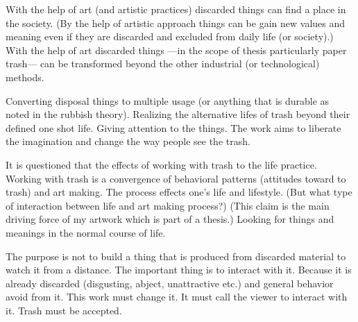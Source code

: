 With the help of art (and artistic practices) discarded things can find a place in the society. (By the help of artistic approach things can be gain new values and meaning even if they are discarded and excluded from daily life (or society).) With the help of art discarded things ---in the scope of thesis particularly paper trash--- can be transformed beyond the other industrial (or technological) methods. 

Converting disposal things to multiple usage (or anything that is durable as noted in the rubbish theory). Realizing the alternative lifes of trash beyond their defined one shot life. Giving attention to the things.  The work aims to liberate the imagination and change the way people see the trash.

It is questioned that the effects of working with trash to the life practice. Working with trash is a convergence of behavioral patterns (attitudes toward to trash) and art making. The process effects one's life and lifestyle. (But what type of interaction between life and art making process?) (This claim is the main driving force of my artwork which is part of a thesis.) Looking for things and meanings in the normal course of life.

The purpose is not to build a thing that is produced from discarded material to watch it from a distance. The important thing is to interact with it. Because it is already discarded (disgusting, abject, unattractive etc.) and general behavior avoid from it. This work must change it. It must call the viewer to interact with it. Trash must be accepted.



